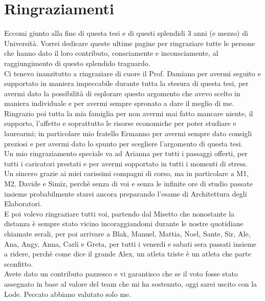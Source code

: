 \documentclass[12pt,a4paper,twoside,openright]{extreport}
\begin{document}
    
    \cleardoublepage
    
    \cleardoublepage
    
    \cleardoublepage
    
    \cleardoublepage
    
    \cleardoublepage
    
    \cleardoublepage
    \printbibliography[heading=bibintoc]
    \cleardoublepage
    \chapter*{Ringraziamenti}
    Eccomi giunto alla fine di questa tesi e di questi splendidi 3 anni (e mezzo) di Università. Vorrei dedicare queste ultime pagine per ringraziare tutte le persone che hanno dato il loro contributo, consciamente e inconsciamente, al raggiungimento di questo splendido traguardo.
    \\Ci tenevo inanzitutto a ringraziare di cuore il Prof. Damiano per avermi seguito e supportato in maniera impeccabile durante tutta la stesura di questa tesi, per avermi dato la possibilità di esplorare questo argomento che avevo scelto in maniera individuale e per avermi sempre spronato a dare il meglio di me. 
    \\Ringrazio poi tutta la mia famiglia per non avermi mai fatto mancare niente, il supporto, l'affetto e soprattutto le risorse economiche per poter studiare e laurearmi; in particolare mio fratello Ermanno per avermi sempre dato consigli preziosi e per avermi dato lo spunto per scegliere l'argomento di questa tesi.
    \\Un mio ringraziamento speciale va ad Arianna per tutti i passaggi offerti, per tutti i caricatori prestati e per avermi sopportato in tutti i momenti di stress.
    \\Un sincero grazie ai miei carissimi compagni di corso, ma in particolare a M1, M2, Davide e Simiz, perchè senza di voi e senza le infinite ore di studio passate insieme probabilmente starei ancora preparando l'esame di Architettura degli Elaboratori.
    \\E poi volevo ringraziare tutti voi, partendo dal Misetto che nonostante la distanza è sempre stato vicino incoraggiandomi durante le nostre quotidiane chiamate serali, per poi arrivare a Blak, Manuel, Mattia, Noel, Sante, Sir, Ale, Ana, Angy, Anna, Carli e Greta, per tutti i venerdi e sabati sera passati insieme a ridere, perchè come dice il grande Alex, un atleta triste è un atleta che parte sconfitto.
    \\Avete dato un contributo pazzesco e vi garantisco che se il voto fosse stato assegnato in base al valore del team che mi ha sostenuto, oggi sarei uscito con la Lode. Peccato abbiano valutato solo me.    \cleardoublepage
\end{document}
